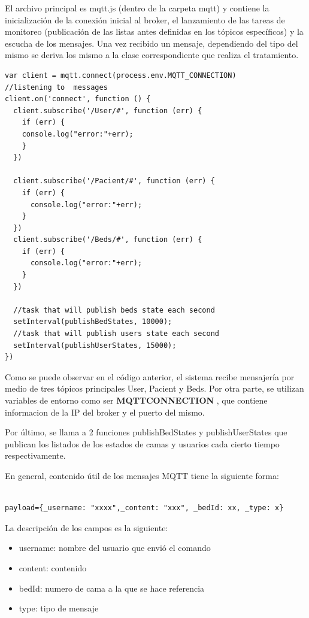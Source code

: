 El archivo principal es mqtt.js (dentro de la carpeta mqtt) y contiene la inicialización de la conexión inicial al broker, el lanzamiento de las tareas de monitoreo (publicación de las listas antes definidas en los tópicos específicos) y la escucha de los mensajes. Una vez recibido un mensaje, dependiendo del tipo del mismo se deriva los mismo a la clase correspondiente que realiza el tratamiento.


\begin{lstlisting}[caption=  Tareas ejecutadas por mqtt.js]
var client = mqtt.connect(process.env.MQTT_CONNECTION)
//listening to  messages
client.on('connect', function () {
  client.subscribe('/User/#', function (err) {
    if (err) {
    console.log("error:"+err);
    }
  })

  client.subscribe('/Pacient/#', function (err) {
    if (err) {      
      console.log("error:"+err);
    }
  })
  client.subscribe('/Beds/#', function (err) {
    if (err) {      
      console.log("error:"+err);
    }
  })

  //task that will publish beds state each second
  setInterval(publishBedStates, 10000);
  //task that will publish users state each second
  setInterval(publishUserStates, 15000);
})
\end{lstlisting}

Como se puede observar en el código anterior, el sistema recibe mensajería por medio de tres tópicos principales User, Pacient y Beds. Por otra parte, se utilizan variables de entorno como ser \textbf{MQTT\textunderscore CONNECTION}  , que contiene informacion de la IP del broker y el puerto del mismo.

Por último, se llama a 2 funciones publishBedStates y publishUserStates que publican los listados de los estados de camas y usuarios cada cierto tiempo respectivamente.




En general, contenido útil de los mensajes MQTT tiene la siguiente forma:

\begin{lstlisting}[caption=  Formato mensaje MQTT]

payload={_username: "xxxx",_content: "xxx", _bedId: xx, _type: x}

\end{lstlisting}

La descripción de los campos es la siguiente:
\begin{itemize}
\item \textunderscore username: nombre del usuario que envió el comando
\item \textunderscore content: contenido
\item \textunderscore bedId: numero de cama a la que se hace referencia
\item \textunderscore type: tipo de mensaje
\end{itemize}

